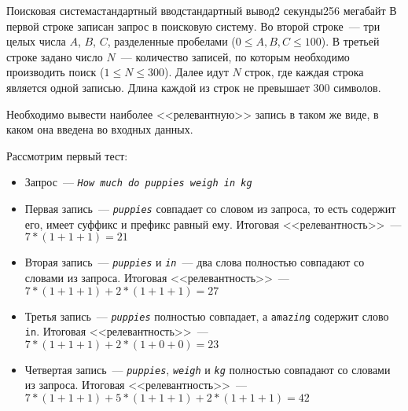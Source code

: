 \begin{problem}{Поисковая система}{стандартный ввод}{стандартный вывод}{2 секунды}{256 мегабайт}
\InputFile
В первой строке записан запрос в поисковую систему. Во второй строке~--- три целых числа $A$, $B$, $C$, разделенные пробелами ($0 \leq A,B,C \leq 100$). В третьей строке задано число $N$~--- количество записей, по которым необходимо производить поиск ($1 \leq N \leq 300$). Далее идут $N$ строк, где каждая строка является одной записью. Длина каждой из строк не превышает 300 символов.

\OutputFile
Необходимо вывести наиболее <<релевантную>> запись в таком же виде, в каком она введена во входных данных.

\Examples

\begin{example}
%
%
\end{example}

\Note
Рассмотрим первый тест: 
\begin{itemize}
\item Запрос~--- \texttt{\emph{How} \emph{much} \emph{do} \emph{puppies} \emph{weigh} \emph{in} \emph{kg}}
\item Первая запись~--- \texttt{\emph{puppies}} совпадает со словом из запроса, то есть содержит его, имеет суффикс и префикс равный ему. Итоговая <<релевантность>>~--- $7*(1+1+1) = 21$
\item Вторая запись~--- \texttt{\emph{puppies}} и \texttt{\emph{in}}~--- два слова полностью совпадают со словами из запроса. Итоговая <<релевантность>>~--- $7*(1+1+1) + 2*(1+1+1) = 27$
\item Третья запись~--- \texttt{\emph{puppies}} полностью совпадает, а \texttt{amaz\emph{in}g} содержит слово \texttt{in}. Итоговая <<релевантность>>~--- $7*(1+1+1) + 2*(1+0+0) = 23$
\item Четвертая запись~--- \texttt{\emph{puppies}}, \texttt{\emph{weigh}} и \texttt{\emph{kg}} полностью совпадают со словами из запроса. Итоговая <<релевантность>>~--- $7*(1+1+1) + 5*(1+1+1) + 2*(1+1+1) = 42$
\end{itemize}

\end{problem}


